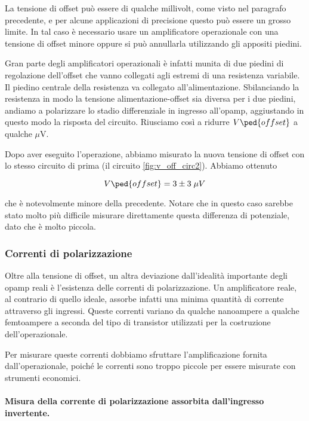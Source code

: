 La tensione di offset può essere di qualche millivolt, come visto nel paragrafo precedente,
e per alcune applicazioni di precisione questo può essere un grosso limite.
In tal caso è necessario usare un amplificatore operazionale con una tensione di offset minore
oppure si può annullarla utilizzando gli appositi piedini.

Gran parte degli amplificatori operazionali è infatti munita di due piedini di regolazione dell'offset
che vanno collegati agli estremi di una resistenza variabile. Il piedino centrale della resistenza
va collegato all'alimentazione. Sbilanciando la resistenza in modo la tensione alimentazione-offset
sia diversa per i due piedini, andiamo a polarizzare lo stadio differenziale in ingresso all'opamp,
aggiustando in questo modo la risposta del circuito. Riusciamo così a ridurre $V\ped{offset}$ a qualche
$\mu$\si{\volt}.

Dopo aver eseguito l'operazione, abbiamo misurato la nuova tensione di offset con lo stesso circuito
di prima (il circuito \ref{fig:v_off_circ2}). Abbiamo ottenuto

\begin{equation}
    V\ped{offset} = 3 \pm 3 \; \mu V
\end{equation}

che è notevolmente minore della precedente. Notare che in questo caso sarebbe stato molto più
difficile misurare direttamente questa differenza di potenziale, dato che è molto piccola.

\subsubsection{Correnti di polarizzazione}

Oltre alla tensione di offset, un altra deviazione dall'idealità importante degli opamp reali è l'esistenza
delle correnti di polarizzazione. Un amplificatore reale, al contrario di quello ideale, assorbe infatti una
minima quantità di corrente attraverso gli ingressi. Queste correnti variano da qualche nanoampere a qualche
femtoampere a seconda del tipo di transistor utilizzati per la costruzione dell'operazionale.

Per misurare queste correnti dobbiamo sfruttare l'amplificazione fornita dall'operazionale, poiché
le correnti sono troppo piccole per essere misurate con strumenti economici.

\paragraph{Misura della corrente di polarizzazione assorbita dall'ingresso invertente.}


